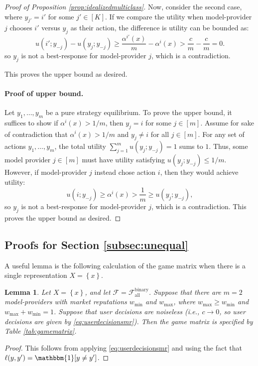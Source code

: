 \documentclass[letterpaper,11pt]{article}
\newtheorem{lemma}{Lemma}
\theoremstyle{plain}
\begin{document}
\begin{proof}[Proof of Proposition \ref{prop:idealizedmulticlass}]
Now, consider the second case, where $y_{j'} = i'$ for some $j' \in [K]$. If we compare the utility when model-provider $j$ chooses $i'$ versus $y_j$ as their action, the difference is utility can be bounded as: 
\[u(i'; y_{-j}) - u(y_j; y_{-j}) \ge \frac{\alpha^{i'}(x)}{m} - \alpha^{i}(x) > \frac{c}{m} - \frac{c}{m} = 0. \]
so $y_j$ is not a best-response for model-provider $j$, which is a contradiction. 

This proves the upper bound as desired. 

\paragraph{Proof of upper bound.} Let $y_1, \ldots, y_m$ be a pure strategy equilibrium. To prove the upper bound, it suffices to show if $\alpha^i(x) > 1/m$, then $y_j = i$ for some $j \in [m]$. Assume for sake of contradiction that $\alpha^i(x) > 1/m$ and $y_j \neq i$ for all $j \in [m]$. For any set of actions $y_1, \ldots, y_m$, the total utility $\sum_{j=1}^m u(y_j; y_{-j}) = 1$ sums to $1$. Thus, some model provider $j \in [m]$ must have utility satisfying $u(y_j; y_{-j}) \le 1/m$. However, if model-provider $j$ instead chose action $i$, then they would achieve utility:
\[u(i; y_{-j}) \ge \alpha^i(x) > \frac{1}{m} \ge u(y_j; y_{-j}), \]
so $y_j$ is not a best-response for model-provider $j$, which is a contradiction. This proves the upper bound as desired. 


\end{proof}

\subsection{Proofs for Section \ref{subsec:unequal}}\label{appendix:proofsunequal}



A useful lemma is the following calculation of the game matrix when there is a single representation $X = \left\{x\right\}$. 
\begin{lemma}
\label{lemma:gamematrix}
Let $X = \left\{x \right\}$, and let $\mathcal{F} = \mathcal{F}^{\text{binary}}_{\text{all}}$. Suppose that there are $m=2$ model-providers with market reputations $w_{\text{min}}$ and $w_{\text{max}}$, where $w_{\text{max}} \ge w_{\text{min}}$ and $w_{\text{max}} +  w_{\text{min}} = 1$. Suppose that user decisions are noiseless (i.e., $c \rightarrow 0$, so user decisions are given by \eqref{eq:userdecisionsmr}). Then the game matrix is specified by Table \ref{tab:gamematrix}.  
\end{lemma}
\begin{proof}
This follows from applying \eqref{eq:userdecisionsmr} and using the fact that $\ell(y, y') = \mathbbm{1}[y \neq y']$. 
\end{proof}
\end{document}
